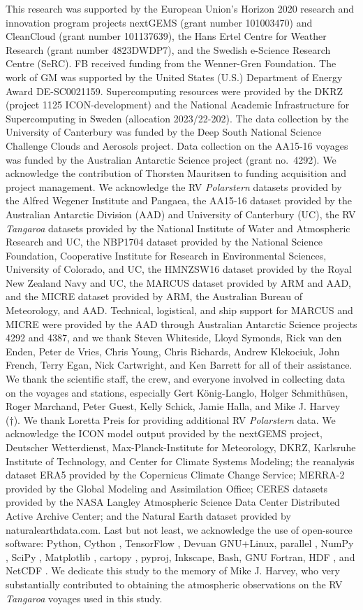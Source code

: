 \documentclass[draft]{agujournal2019}
\begin{document}
This research was supported by the European Union’s Horizon 2020 research and innovation program projects nextGEMS (grant number 101003470) and CleanCloud (grant number 101137639), the Hans Ertel Centre for Weather Research (grant number 4823DWDP7), and the Swedish e-Science Research Centre (SeRC). FB received funding from the Wenner-Gren Foundation. The work of GM was supported by the United States (U.S.) Department of Energy Award DE-SC0021159. Supercomputing resources were provided by the DKRZ (project 1125 ICON-development) and the National Academic Infrastructure for Supercomputing in Sweden (allocation 2023/22-202). The data collection by the University of Canterbury was funded by the Deep South National Science Challenge Clouds and Aerosols project. Data collection on the AA15-16 voyages was funded by the Australian Antarctic Science project (grant no.~4292). We acknowledge the contribution of Thorsten Mauritsen to funding acquisition and project management. We acknowledge the RV \emph{Polarstern} datasets provided by the Alfred Wegener Institute and Pangaea, the AA15-16 dataset provided by the Australian Antarctic Division (AAD) and University of Canterbury (UC), the RV \emph{Tangaroa} datasets provided by the National Institute of Water and Atmospheric Research and UC, the NBP1704 dataset provided by the National Science Foundation, Cooperative Institute for Research in Environmental Sciences, University of Colorado, and UC, the HMNZSW16 dataset provided by the Royal New Zealand Navy and UC, the MARCUS dataset provided by ARM and AAD, and the MICRE dataset provided by ARM, the Australian Bureau of Meteorology, and AAD. Technical, logistical, and ship support for MARCUS and MICRE were provided by the AAD through Australian Antarctic Science projects 4292 and 4387, and we thank Steven Whiteside, Lloyd Symonds, Rick van den Enden, Peter de Vries, Chris Young, Chris Richards, Andrew Klekociuk, John French, Terry Egan, Nick Cartwright, and Ken Barrett for all of their assistance. We thank the scientific staff, the crew, and everyone involved in collecting data on the voyages and stations, especially Gert König-Langlo, Holger Schmithüsen, Roger Marchand, Peter Guest, Kelly Schick, Jamie Halla, and Mike J. Harvey (†). We thank Loretta Preis for providing additional RV \emph{Polarstern} data. We acknowledge the ICON model output provided by the nextGEMS project, Deutscher Wetterdienst, Max-Planck-Institute for Meteorology, DKRZ, Karlsruhe Institute of Technology, and Center for Climate Systems Modeling; the reanalysis dataset ERA5 provided by the Copernicus Climate Change Service; MERRA-2 provided by the Global Modeling and Assimilation Office; CERES datasets provided by the NASA Langley Atmospheric Science Data Center Distributed Active Archive Center; and the Natural Earth dataset provided by naturalearthdata.com. Last but not least, we acknowledge the use of open-source software: Python, Cython \cite{behnel2011}, TensorFlow \cite{abadi2016}, Devuan GNU+Linux, parallel \cite{tange2011}, NumPy \cite{harris2020}, SciPy \cite{virtanen2020}, Matplotlib \cite{hunter2007}, cartopy \cite{cartopy}, pyproj, Inkscape, Bash, GNU Fortran, HDF \cite{folk1999}, and NetCDF \cite{rew1990}. We dedicate this study to the memory of Mike J. Harvey, who very substantially contributed to obtaining the atmospheric observations on the RV \emph{Tangaroa} voyages used in this study.


\end{document}

